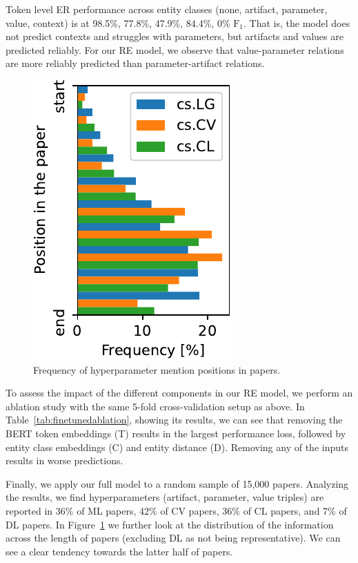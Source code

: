 Token level ER performance across entity classes (none, artifact, parameter, value, context) is at 98.5\%, 77.8\%, 47.9\%, 84.4\%, 0\% $\text{F}_1$. That is, the model does not predict contexts and struggles with parameters, but artifacts and values are predicted reliably. For our RE model, we observe that value-parameter relations are more reliably predicted than parameter-artifact relations.

\begin{figure}
  \centering
  \includegraphics[width=0.3\linewidth]{figures/ref_params/hyperparam_pos-crop}
  \caption{Frequency of hyperparameter mention positions in papers.}
  \label{fig:hyperparam_info_pos}
\end{figure}


To assess the impact of the different components in our RE model, we perform an ablation study with the same 5-fold cross-validation setup as above. In Table~\ref{tab:finetunedablation}, showing its results, we can see that removing the BERT token embeddings (T) results in the largest performance loss, followed by entity class embeddings (C) and entity distance (D). Removing any of the inputs results in worse predictions.

Finally, we apply our full model to a random sample of 15,000 papers. Analyzing the results, we find hyperparameters (artifact, parameter, value triples) are reported in 36\% of ML papers, 42\% of CV papers, 36\% of CL papers, and 7\% of DL papers. In Figure~\ref{fig:hyperparam_info_pos} we further look at the distribution of the information across the length of papers (excluding DL as not being representative). We can see a clear tendency towards the latter half of papers.


